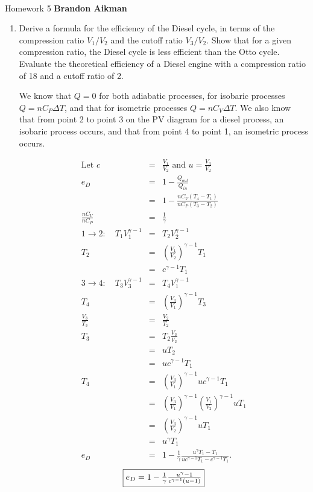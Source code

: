 \documentclass[12pt]{article}
\begin{document}
 \\
Homework 5 \hfill {\bf Brandon Aikman}

\begin{enumerate}
	\item Derive a formula for the efficiency of the Diesel cycle, in terms of the compression ratio $V_1/V_2$ and the cutoff ratio $V_3/V_2$. Show that for a given compression ratio, the Diesel cycle is less efficient than the Otto cycle. Evaluate the theoretical efficiency of a Diesel engine with a compression ratio of 18 and a cutoff ratio of 2.

	We know that $Q = 0$ for both adiabatic processes, for isobaric processes $Q = n C_P \Delta T$, and that for isometric processes $Q = n C_V \Delta T$. We also know that from point 2 to point 3 on the PV diagram for a diesel process, an isobaric process occurs, and that from point 4 to point 1, an isometric process occurs.

	\begin{eqnarray*}
		\mbox{Let } c &=& \frac{V_1}{V_2} \mbox{ and } u = \frac{V_3}{V_2} \\
		e_D &=& 1 - \frac{Q_{out}}{Q_{in}} \\
		&=& 1 - \frac{n C_V (T_4 - T_1)}{n C_P (T_3 - T_2)} \\
		\frac{n C_V}{n C_P} &=& \frac{1}{\gamma}\\
		1 \rightarrow 2: \quad T_1 V_1^{\gamma-1} &=& T_2 V_2^{\gamma-1} \\
		T_2 &=& \left( \frac{V_1}{V_2} \right)^{\gamma-1} T_1 \\
		&=& c^{\gamma-1}T_1\\
		3 \rightarrow 4: \quad T_3 V_3^{\gamma-1} &=& T_4 V_1^{\gamma-1} \\
		T_4 &=& \left( \frac{V_3}{V_1} \right)^{\gamma-1} T_3 \\
		\frac{V_3}{T_3} &=& \frac{V_2}{T_2} \\
		T_3 &=& T_2 \frac{V_3}{V_2} \\
		&=& u T_2\\
		&=& u c^{\gamma-1} T_1 \\
		T_4 &=& \left( \frac{V_3}{V_1} \right)^{\gamma-1} u c^{\gamma-1} T_1\\
		&=& \left( \frac{V_3}{V_1} \right)^{\gamma-1} \left( \frac{V_1}{V_2} \right)^{\gamma-1} u T_1\\
		&=& \left( \frac{V_3}{V_2} \right)^{\gamma-1} u T_1\\
		&=& u^\gamma T_1 \\
		e_D &=& 1 - \frac{1}{\gamma} \frac{u^\gamma T_1 - T_1}{u c^{\gamma-1} T_1 - c^{\gamma-1}T_1}.
	\end{eqnarray*}
	$$\fbox{$e_D = 1 - \frac{1}{\gamma} \frac{u^\gamma - 1}{c^{\gamma-1}(u - 1)}$}$$


\end{enumerate}
\end{document}
